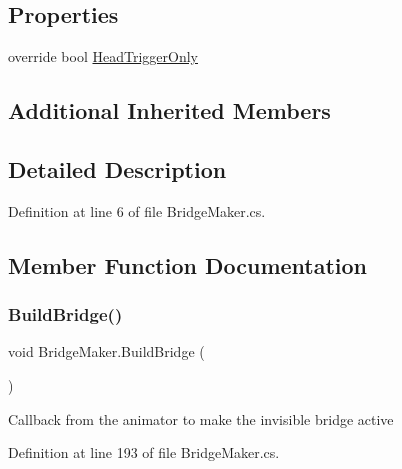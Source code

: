 \subsection*{Properties}
\begin{DoxyCompactItemize}
\item 
override bool \mbox{\hyperlink{class_bridge_maker_ae19669b24ef7131ae7d9bfe8fc9f72cf}{Head\+Trigger\+Only}}
\end{DoxyCompactItemize}
\subsection*{Additional Inherited Members}


\subsection{Detailed Description}


Definition at line 6 of file Bridge\+Maker.\+cs.



\subsection{Member Function Documentation}
\mbox{\label{class_bridge_maker_a9f0d946af5000826f91a6f7d0e361d63}} 
\subsubsection{\texorpdfstring{Build\+Bridge()}{BuildBridge()}}
{\footnotesize\ttfamily void Bridge\+Maker.\+Build\+Bridge (\begin{DoxyParamCaption}{ }\end{DoxyParamCaption})}



Callback from the animator to make the invisible bridge active 



Definition at line 193 of file Bridge\+Maker.\+cs.

\mbox{\label{class_bridge_maker_a667e3fa3514b0256b73ce3149dabaf90}} 
